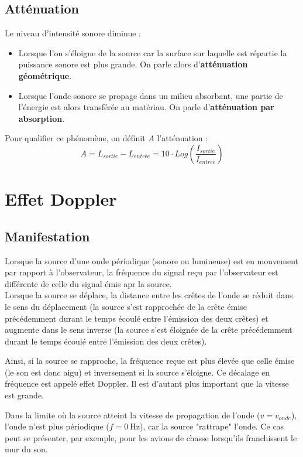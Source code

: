 \documentclass[a4paper,11pt,fleqn]{article}%
\begin{document}
\newpage
	\subsection{Atténuation}
	Le niveau d'intensité sonore diminue :
	\begin{itemize}
		\item Lorsque l'on s'éloigne de la source car la surface sur laquelle est répartie la puissance sonore est plus grande. On parle alors d'\textbf{atténuation géométrique}.
		\item Lorsque l'onde sonore se propage dans un milieu absorbant, une partie de l'énergie est alors transférée au matériau. On parle d'\textbf{atténuation par absorption}.
	\end{itemize}
    Pour qualifier ce phénomène, on définit $A$ l'atténuation :
    $$A=L_{sortie}-L_{entrée} = 10\cdot Log\left(\dfrac{I_{sortie}}{I_{entree}}\right)$$
\section{Effet Doppler}
\subsection{Manifestation}
Lorsque la source d'une onde périodique (sonore ou lumineuse) est en mouvement par rapport à l'observateur, la fréquence du signal reçu par l'observateur est différente de celle du signal émis apr la source.\\
Lorsque la source se déplace, la distance entre les crêtes de l'onde se réduit dans le sens du déplacement (la source s'est rapprochée de la crête émise précédemment durant le temps écoulé entre l'émission des deux crêtes) et augmente dans le sens inverse (la source s'est éloignée de la crête précédemment durant le temps écoulé entre l'émission des deux crêtes).

\noindent\colorbox{blue!10}{
	\begin{minipage}{.98\linewidth}
        Ainsi, si la source se rapproche, la fréquence reçue est plus élevée que celle émise (le son est donc aigu) et inversement si la source s'éloigne. Ce décalage en fréquence est appelé effet Doppler. Il est d'autant plus important que la vitesse est grande.
    \end{minipage}
}
Dans la limite où la source atteint la vitesse de propagation de l'onde ($v=v_{onde}$), l'onde n'est plus périodique ($f=\SI{0}{\hertz}$), car la source "rattrape" l'onde. Ce cas peut se présenter, par exemple, pour les avions de chasse lorsqu'ils franchissent le mur du son.
\end{document}
